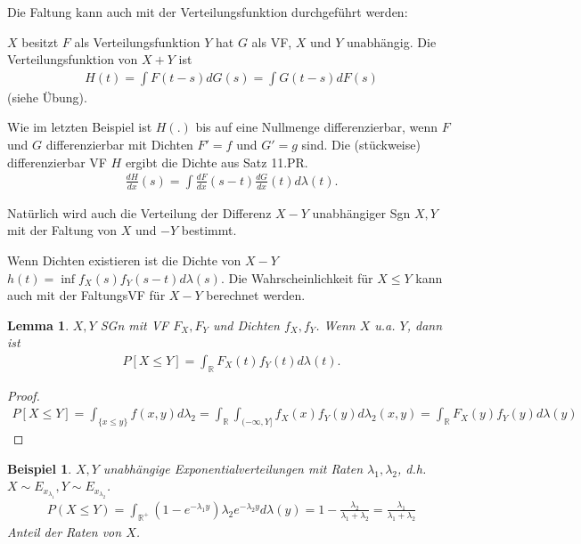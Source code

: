 \documentclass[]{article}
\newtheorem{lemma}{Lemma}
\newtheorem*{example}{Beispiel}
\begin{document}
Die Faltung kann auch mit der Verteilungsfunktion durchgeführt werden:

$X$ besitzt $F$ als Verteilungsfunktion $Y$ hat $G$ als VF, $X$ und $Y$ unabhängig. Die Verteilungsfunktion von $X+Y$ ist
\begin{align*}
	H(t) = \int F(t-s) dG(s) = \int G(t-s) dF(s)
\end{align*}
(siehe Übung).

Wie im letzten Beispiel ist $H(.)$ bis auf eine Nullmenge differenzierbar, wenn $F$ und $G$ differenzierbar mit Dichten $F'=f$ und $G'=g$ sind. Die (stückweise) differenzierbar VF $H$ ergibt die Dichte aus Satz 11.PR.
\begin{align*}
	\frac{dH}{dx}(s) = \int \frac{dF}{dx}(s-t)\frac{dG}{dx}(t) d\lambda(t).
\end{align*}

Natürlich wird auch die Verteilung der Differenz $X-Y$ unabhängiger Sgn $X,Y$ mit der Faltung von $X$ und $-Y$ bestimmt.

Wenn Dichten existieren ist die Dichte von $X-Y$ $h(t)=\inf f_X(s) f_Y(s-t) d\lambda(s)$. Die Wahrscheinlichkeit für $X \leq Y$ kann auch mit der FaltungsVF für $X-Y$ berechnet werden.

\begin{lemma}
	$X,Y$ SGn mit VF $F_X,F_Y$ und Dichten $f_X,f_Y$. Wenn $X$ u.a. $Y$, dann ist
	\begin{align*}
		P[X\leq Y] = \int_\mathbb{R} F_X(t)f_Y(t) d\lambda(t).
	\end{align*}
\end{lemma}
\begin{proof}
	\begin{align*}
		P[X\leq Y] = \int_{\{x\leq y\}} f(x,y) d\lambda_2 = \int_\mathbb{R} \int_{(-\infty,Y]} f_X(x) f_Y(y) d\lambda_2(x,y) = \int_\mathbb{R} F_X(y)f_Y(y) d\lambda(y)
	\end{align*}
\end{proof}
\begin{example}
	$X,Y$ unabhängige Exponentialverteilungen mit Raten $\lambda_1,\lambda_2$, d.h. $X\sim E_{x_{\lambda_1}}, Y \sim E_{x_{\lambda_2}}$.
	\begin{align*}
		P(X\leq Y) = \int_{\mathbb{R}^+} (1-e^{-\lambda_1y})\lambda_2 e^{-\lambda_2y}d\lambda(y) = 1 - \frac{\lambda_2}{\lambda_1+\lambda_2} = \frac{\lambda_1}{\lambda_1 + \lambda_2}
	\end{align*}
	Anteil der Raten von $X$.
\end{example}
\end{document}
